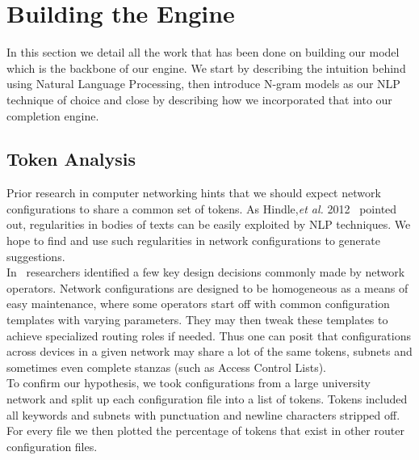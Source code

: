 \section{Building the Engine}

In this section we detail all the work that has been done on building our model which is the backbone of our engine. We start by describing the intuition behind using Natural Language Processing, then introduce N-gram models as our NLP technique of choice and close by describing how we incorporated that into our completion engine.

\subsection{Token Analysis}
Prior research in computer networking hints that we should expect network configurations to share a common set of tokens. As Hindle,\textit{et al.} 2012~\cite{naturalness} pointed out, regularities in bodies of texts can be easily exploited by NLP techniques. We hope to find and use such regularities in network configurations to generate suggestions.\\

In~\cite{complexity} researchers identified a few key design decisions commonly made by network operators. Network configurations are designed to be homogeneous as a means of easy maintenance, where some operators start off with common configuration templates with varying parameters. They may then tweak these templates to achieve specialized routing roles if needed. Thus one can posit that configurations across devices in a given network may share a lot of the same tokens, subnets and sometimes even complete stanzas (such as Access Control Lists).\\ 

To confirm our hypothesis, we took configurations from a large university network and split up each configuration file into a list of tokens. Tokens included all keywords and subnets with punctuation and newline characters stripped off. For every file we then plotted the percentage of tokens that exist in other router configuration files.

